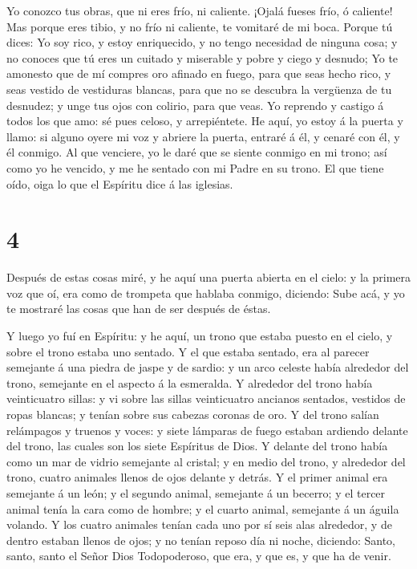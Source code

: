  Yo conozco tus obras, que ni eres frío, ni caliente.
¡Ojalá fueses frío, ó caliente!  Mas porque eres tibio, y
no frío ni caliente, te vomitaré de mi boca.  Porque tú
dices: Yo soy rico, y estoy enriquecido, y no tengo necesidad de ninguna
cosa; y no conoces que tú eres un cuitado y miserable y pobre y ciego y
desnudo;  Yo te amonesto que de mí compres oro afinado en
fuego, para que seas hecho rico, y seas vestido de vestiduras blancas,
para que no se descubra la vergüenza de tu desnudez; y unge tus ojos con
colirio, para que veas.  Yo reprendo y castigo á todos los
que amo: sé pues celoso, y arrepiéntete.  He aquí, yo estoy
á la puerta y llamo: si alguno oyere mi voz y abriere la puerta, entraré
á él, y cenaré con él, y él conmigo.  Al que venciere, yo
le daré que se siente conmigo en mi trono; así como yo he vencido, y me
he sentado con mi Padre en su trono.  El que tiene oído,
oiga lo que el Espíritu dice á las iglesias.

\hypertarget{section-3}{%
\section{4}\label{section-3}}

 Después de estas cosas miré, y he aquí una puerta abierta
en el cielo: y la primera voz que oí, era como de trompeta que hablaba
conmigo, diciendo: Sube acá, y yo te mostraré las cosas que han de ser
después de éstas.

 Y luego yo fuí en Espíritu: y he aquí, un trono que estaba
puesto en el cielo, y sobre el trono estaba uno sentado.  Y
el que estaba sentado, era al parecer semejante á una piedra de jaspe y
de sardio: y un arco celeste había alrededor del trono, semejante en el
aspecto á la esmeralda.  Y alrededor del trono había
veinticuatro sillas: y vi sobre las sillas veinticuatro ancianos
sentados, vestidos de ropas blancas; y tenían sobre sus cabezas coronas
de oro.  Y del trono salían relámpagos y truenos y voces: y
siete lámparas de fuego estaban ardiendo delante del trono, las cuales
son los siete Espíritus de Dios.  Y delante del trono había
como un mar de vidrio semejante al cristal; y en medio del trono, y
alrededor del trono, cuatro animales llenos de ojos delante y detrás.
 Y el primer animal era semejante á un león; y el segundo
animal, semejante á un becerro; y el tercer animal tenía la cara como de
hombre; y el cuarto animal, semejante á un águila volando. 
Y los cuatro animales tenían cada uno por sí seis alas alrededor, y de
dentro estaban llenos de ojos; y no tenían reposo día ni noche,
diciendo: Santo, santo, santo el Señor Dios Todopoderoso, que era, y que
es, y que ha de venir.

